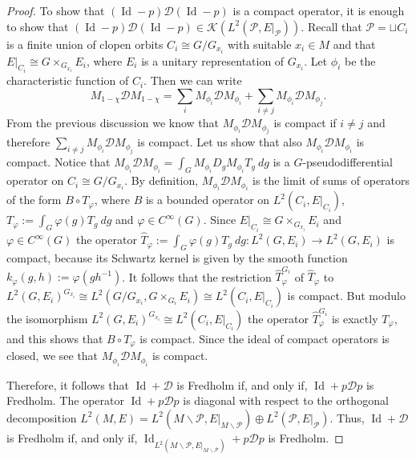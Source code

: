 \documentclass[10pt,a4paper]{amsart}
\newcommand{\maD}{\mathcal D}
\newcommand{\maK}{\mathcal K}
\newcommand{\maP}{\mathcal P}
\newcommand{\oid}{\operatorname{Id}}
\begin{document}
\begin{proof}
To show that $(\oid-p)\maD (\oid-p) $ is a compact operator, it is enough to show that 
$(\oid-p) \maD (\oid-p)\in \maK(L^2(\maP,E\vert_\maP))$. 
Recall that $\maP=\sqcup C_i$ is a finite union of clopen orbits $C_i \cong G/G_{x_i}$ with suitable $x_i\in M$ 
and that $E\vert_{C_i} \cong G \times_{G_{x_i}} E_{i}$,
where $E_{i}$ is a unitary representation of $G_{x_i}$.    
Let $\phi_i$ be the characteristic function of $C_i$. Then we can write
\begin{equation*}
M_{1-\chi} \maD M_{1-\chi} = \sum_i M_{\phi_i} \maD M_{\phi_i} + \sum_{i\neq j} M_{\phi_i} \maD M_{\phi_j}.
\end{equation*} 
From the previous discussion we know that $M_{\phi_i} \maD M_{\phi_j}$ is compact if $i \neq j$ 
and therefore $\sum_{i\neq j} M_{\phi_i} \maD M_{\phi_j}$ is compact.
Let us show that also $M_{\phi_i} \maD M_{\phi_i} $ is compact.
Notice that $M_{\phi_i} \maD M_{\phi_i} = \int_G M_{\phi_i} D_g M_{\phi_i} T_g \ dg$ is a $G$-pseudodifferential operator
on $C_i \cong G/G_{x_i}$. By definition, $M_{\phi_i} \maD M_{\phi_i}$ is the limit of sums of operators of the form 
$B \circ T_\varphi$, where $B$  is a bounded operator on $L^2(C_i,E\vert_{C_i})$, 
$T_\varphi:=\int_G \varphi(g) T_g \ dg$ and $\varphi \in C^\infty(G)$.
Since %
$E\vert_{C_i} \cong G \times_{G_{x_i}} E_{i}$ %
and $\varphi \in C^\infty(G)$  the operator 
$ \hat{T}_\varphi:=\int_G \varphi(g) T_g \ dg : L^2(G,E_{i}) \rightarrow L^2(G,E_{i})$ is compact, 
because its Schwartz kernel is given by the smooth function $k_\varphi(g,h):=\varphi(gh^{-1})$. 
It follows that the restriction $\hat{T}_\varphi^{G_{i}}$ of $\hat{T}_\varphi$ to 
$L^2(G,E_{i})^{G_{x_i}}\cong L^2(G/G_{x_i},G \times_{G_{i}} E_{i})\cong L^2(C_i,E\vert_{C_i})$ is compact.
But modulo the isomorphism $L^2(G,E_{i})^{G_{x_i}} \cong L^2(C_i,E\vert_{C_i})$ the operator $\hat{T}_\varphi^{G_{i}}$ is exactly $T_\varphi$,
and this shows that $B \circ T_\varphi$ is compact.
Since the ideal of compact operators is closed, we see that $M_{\phi_i} \maD M_{\phi_i}$ is compact.

Therefore, it follows that $\oid + \maD$ is Fredholm if, and only if, 
$\oid + p \maD p$ is Fredholm.
The operator $\oid + p \maD p$ is diagonal with respect to the orthogonal decomposition 
$L^2(M,E) =L^2(M\smallsetminus \maP , E\vert_{M\smallsetminus \maP}) \oplus L^2(\maP,E\vert_\maP)$.
Thus, $\oid + \maD$ is Fredholm if, and only if, 
$\oid_{L^2(M\smallsetminus \maP,E\vert_{M\smallsetminus \maP})} + p \maD p$ is Fredholm.


\end{proof}
\end{document}
